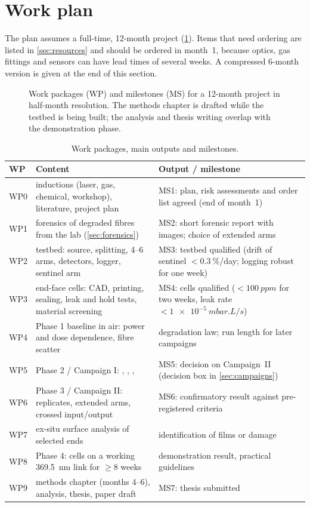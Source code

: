 \section{Work plan}\label{sec:workplan}

The plan assumes a full-time, 12-month project (\cref{fig:gantt}). Items that need ordering are listed
in \cref{sec:resources} and should be ordered in month~1, because optics, gas fittings and sensors
can have lead times of several weeks. A compressed 6-month version is given at the end of this section.

\begin{figure}[t]
  \centering
  
  \caption{Work packages (WP) and milestones (MS) for a 12-month project in half-month resolution. The
  methods chapter is drafted while the testbed is being built; the analysis and thesis writing overlap
  with the demonstration phase.}
  \label{fig:gantt}
\end{figure}

\begin{table}[t]
\centering\small
\caption{Work packages, main outputs and milestones.}
\label{tab:wps}
\begin{tabularx}{\textwidth}{@{}l Y L{5.0cm}@{}}
\toprule
WP & Content & Output / milestone \\
\midrule
WP0 & inductions (laser, gas, chemical, workshop), literature, project plan & MS1: plan, risk assessments
      and order list agreed (end of month~1) \\
WP1 & forensics of degraded fibres from the lab (\cref{sec:forensics}) & MS2: short forensic report with
      images; choice of extended arms \\
WP2 & testbed: source, splitting, 4--6 arms, detectors, logger, sentinel arm & MS3: testbed qualified
      (drift of sentinel $<\SI{0.3}{\percent}$/day; logging robust for one week) \\
WP3 & end-face cells: CAD, printing, sealing, leak and \Oxy{} hold tests, material screening
    & MS4: cells qualified ($<\SI{100}{ppm}$ \Oxy{} for two weeks, leak rate $<\SI{1e-5}{mbar.L/s}$) \\
WP4 & Phase 1 baseline in air: power and dose dependence, fibre scatter & degradation law; run length
      for later campaigns \\
WP5 & Phase 2 / Campaign I: , , ,  & MS5: decision on Campaign~II
      (decision box in \cref{sec:campaigns}) \\
WP6 & Phase 3 / Campaign II: replicates, extended arms, crossed input/output & MS6: confirmatory result
      against pre-registered criteria \\
WP7 & ex-situ surface analysis of selected ends & identification of films or damage \\
WP8 & Phase 4: cells on a working \SI{369.5}{nm} link for $\geq 8$ weeks & demonstration result,
      practical guidelines \\
WP9 & methods chapter (months 4--6), analysis, thesis, paper draft & MS7: thesis submitted \\
\bottomrule
\end{tabularx}
\end{table}

